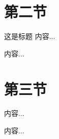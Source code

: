 \documentclass[10pt,aspectratio=169,t]{ctexbeamer}
\begin{document}
	\section{第二节}
	
		\begin{frame}{这是标题}
		内容...
	\end{frame}	
		\begin{frame}
		内容...
	\end{frame}	
	
	\section{第三节}
	\begin{frame}
		内容...
	\end{frame}	
	
	\begin{frame}
		内容...
	\end{frame}	
	
\end{document}

